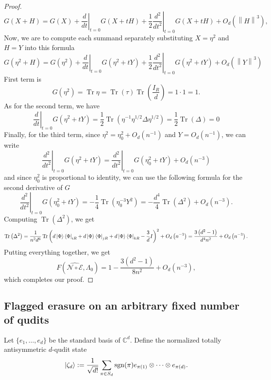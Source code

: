 \documentclass[10pt,twocolumn,superscriptaddress,aps,amsmath,amssymb,citeautoscript,floatfix,prx]{revtex4-2}
\theoremstyle{plain}
\theoremstyle{plain}
\theoremstyle{plain}
\theoremstyle{plain}
\theoremstyle{plain}
\theoremstyle{plain}
\newcommand{\C}{\mathbb{C}}
\theoremstyle{plain}
\theoremstyle{definition}
\theoremstyle{plain}
\begin{document}
\begin{appendix}
\begin{proof}
\[        G\left(X+H\right)=G\left(X\right)+\left.\frac{d}{d t}\right|_{t=0} G(X+t H)+\frac{1}{2} \left.\frac{d^2}{d t^2}\right|_{t=0} G\left(X+t H\right)+O_{d}\left(\left\|H\right\|^3\right),
    \]
    Now, we are to compute each summand separately substituting $X=\eta^2$ and $H=Y$ into this formula
    \[
        G\left(\eta^2+H\right)=G\left(\eta^2\right)+\left.\frac{d}{d t}\right|_{t=0} G(\eta^2+t Y)+\frac{1}{2} \left.\frac{d^2}{d t^2}\right|_{t=0} G\left(\eta^2+t Y\right)+O_{d}\left(\left\|Y\right\|^3\right)
    \]
    First term is
    \[
        G\left(\eta^2\right) = \operatorname{Tr} \eta= \operatorname{Tr}\left(\tau\right) \operatorname{Tr}\left(\frac{I_R}{d}\right)=1 \cdot 1=1.
    \]
    As for the second term, we have
    \[
        \left.\frac{d}{d t}\right|_{t=0} G(\eta^2+t Y)=\frac{1}{2} \operatorname{Tr}\left(\eta^{-1} \eta^{1 / 2} \Delta \eta^{1 / 2}\right)=\frac{1}{2} \operatorname{Tr}\left(\Delta\right)=0
    \]
    Finally, for the third term, since $\eta^2=\eta_0^2+O_{d}\left(n^{-1}\right)$ and $Y=O_{d}\left(n^{-1}\right)$, we can write
    \[
        \left.\frac{d^2}{d t^2}\right|_{t=0} G\left(\eta^2+t Y\right)=\left.\frac{d^2}{d t^2}\right|_{t=0} G\left(\eta_0^2+t Y\right)+O_{d}\left(n^{-3}\right)
    \]
    and since $\eta_0^2$ is proportional to identity, we can use the following formula for the second derivative of $G$ 
    \[
        \left.\frac{d^2}{d t^2}\right|_{t=0} G\left(\eta_0^2+t Y\right)=-\frac{1}{4}  \operatorname{Tr}\left(\eta_0^{-3} Y^2\right)=-\frac{d^4}{4} \operatorname{Tr}\left(\Delta^2\right)+O_{d}\left(n^{-3}\right).
    \]
    Computing $\operatorname{Tr}(\Delta^2)$, we get
    \[
        \operatorname{Tr}\left(\Delta^2\right)=\frac{1}{n^2 d^6} \operatorname{Tr}\left(d\ket{\Phi}\bra{\Phi}_{i R}+d\ket{\Phi}\bra{\Phi}_{j R}+d\ket{\Phi}\bra{\Phi}_{k R}-\frac{3}{d} I\right)^2+O_{d}\left(n^{-3}\right)=\frac{3\left(d^2-1\right)}{d^4n^2}+O_{d}\left(n^{-3}\right).
    \]
    Putting everything together, we get
    \[
                F(\widehat{\mathcal{N} \circ \mathcal{E}}, \Lambda_0)=1-\frac{3\left(d^2-1\right)}{8n^2}+O_{d}\left(n^{-3}\right),
    \]
    which completes our proof.
\end{proof}

\subsection{Flagged erasure on an arbitrary fixed number of qudits}\label{subsec:supple_multiqudit_erasure}

Let $\{e_1,\ldots,e_d\}$ be the standard basis of $\C^d$. Define the normalized totally antisymmetric $d$-qudit state
\begin{equation}
\label{eq:singlet}
  \ket{\zeta_d}
  :=\frac1{\sqrt{d!}}
  \sum_{\pi\in S_d}\operatorname{sgn}(\pi)
  e_{\pi(1)}\otimes\cdots\otimes e_{\pi(d)}.
\end{equation}


\end{appendix}
\end{document}

